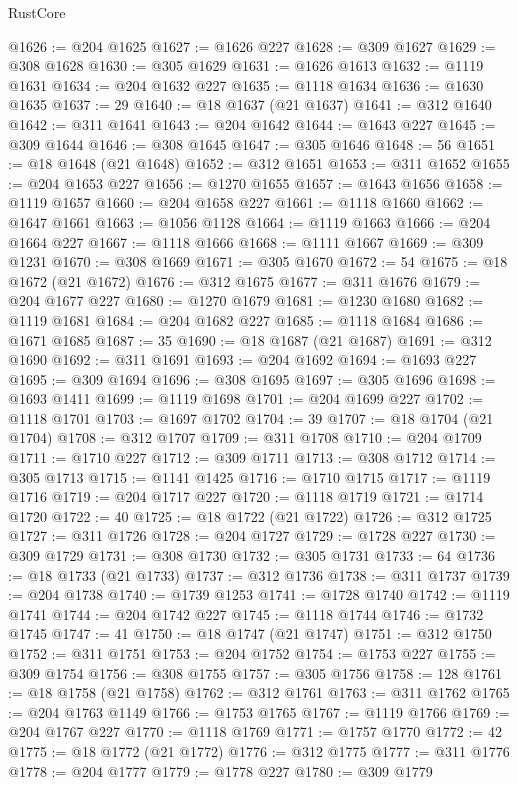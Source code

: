 \begin{lexlean}{RustCore}
\begin{coremodule}
@1626 := @204 @1625
@1627 := @1626 @227
@1628 := @309 @1627
@1629 := @308 @1628
@1630 := @305 @1629
@1631 := @1626 @1613
@1632 := @1119 @1631
@1634 := @204 @1632 @227
@1635 := @1118 @1634
@1636 := @1630 @1635
@1637 := 29
@1640 := @18 @1637 (@21 @1637)
@1641 := @312 @1640
@1642 := @311 @1641
@1643 := @204 @1642
@1644 := @1643 @227
@1645 := @309 @1644
@1646 := @308 @1645
@1647 := @305 @1646
@1648 := 56
@1651 := @18 @1648 (@21 @1648)
@1652 := @312 @1651
@1653 := @311 @1652
@1655 := @204 @1653 @227
@1656 := @1270 @1655
@1657 := @1643 @1656
@1658 := @1119 @1657
@1660 := @204 @1658 @227
@1661 := @1118 @1660
@1662 := @1647 @1661
@1663 := @1056 @1128
@1664 := @1119 @1663
@1666 := @204 @1664 @227
@1667 := @1118 @1666
@1668 := @1111 @1667
@1669 := @309 @1231
@1670 := @308 @1669
@1671 := @305 @1670
@1672 := 54
@1675 := @18 @1672 (@21 @1672)
@1676 := @312 @1675
@1677 := @311 @1676
@1679 := @204 @1677 @227
@1680 := @1270 @1679
@1681 := @1230 @1680
@1682 := @1119 @1681
@1684 := @204 @1682 @227
@1685 := @1118 @1684
@1686 := @1671 @1685
@1687 := 35
@1690 := @18 @1687 (@21 @1687)
@1691 := @312 @1690
@1692 := @311 @1691
@1693 := @204 @1692
@1694 := @1693 @227
@1695 := @309 @1694
@1696 := @308 @1695
@1697 := @305 @1696
@1698 := @1693 @1411
@1699 := @1119 @1698
@1701 := @204 @1699 @227
@1702 := @1118 @1701
@1703 := @1697 @1702
@1704 := 39
@1707 := @18 @1704 (@21 @1704)
@1708 := @312 @1707
@1709 := @311 @1708
@1710 := @204 @1709
@1711 := @1710 @227
@1712 := @309 @1711
@1713 := @308 @1712
@1714 := @305 @1713
@1715 := @1141 @1425
@1716 := @1710 @1715
@1717 := @1119 @1716
@1719 := @204 @1717 @227
@1720 := @1118 @1719
@1721 := @1714 @1720
@1722 := 40
@1725 := @18 @1722 (@21 @1722)
@1726 := @312 @1725
@1727 := @311 @1726
@1728 := @204 @1727
@1729 := @1728 @227
@1730 := @309 @1729
@1731 := @308 @1730
@1732 := @305 @1731
@1733 := 64
@1736 := @18 @1733 (@21 @1733)
@1737 := @312 @1736
@1738 := @311 @1737
@1739 := @204 @1738
@1740 := @1739 @1253
@1741 := @1728 @1740
@1742 := @1119 @1741
@1744 := @204 @1742 @227
@1745 := @1118 @1744
@1746 := @1732 @1745
@1747 := 41
@1750 := @18 @1747 (@21 @1747)
@1751 := @312 @1750
@1752 := @311 @1751
@1753 := @204 @1752
@1754 := @1753 @227
@1755 := @309 @1754
@1756 := @308 @1755
@1757 := @305 @1756
@1758 := 128
@1761 := @18 @1758 (@21 @1758)
@1762 := @312 @1761
@1763 := @311 @1762
@1765 := @204 @1763 @1149
@1766 := @1753 @1765
@1767 := @1119 @1766
@1769 := @204 @1767 @227
@1770 := @1118 @1769
@1771 := @1757 @1770
@1772 := 42
@1775 := @18 @1772 (@21 @1772)
@1776 := @312 @1775
@1777 := @311 @1776
@1778 := @204 @1777
@1779 := @1778 @227
@1780 := @309 @1779

\end{coremodule}
\end{lexlean}
